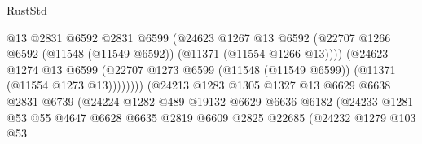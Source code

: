 \begin{lexlean}{RustStd}
\begin{coremodule}
                                          @13
                                          @2831
                                          @6592
                                          @2831
                                          @6599
                                          (@24623
                                            @1267
                                            @13
                                            @6592
                                            (@22707
                                              @1266
                                              @6592
                                              (@11548 (@11549 @6592))
                                              (@11371 (@11554 @1266 @13))))
                                          (@24623
                                            @1274
                                            @13
                                            @6599
                                            (@22707
                                              @1273
                                              @6599
                                              (@11548 (@11549 @6599))
                                              (@11371 (@11554 @1273 @13))))))))
                                  (@24213
                                    @1283
                                    @1305
                                    @1327
                                    @13
                                    @6629
                                    @6638
                                    @2831
                                    @6739
                                    (@24224
                                      @1282
                                      @489
                                      @19132
                                      @6629
                                      @6636
                                      @6182
                                      (@24233
                                        @1281
                                        @53
                                        @55
                                        @4647
                                        @6628
                                        @6635
                                        @2819
                                        @6609
                                        @2825
                                        @22685
                                        (@24232
                                          @1279
                                          @103
                                          @53

\end{coremodule}
\end{lexlean}
